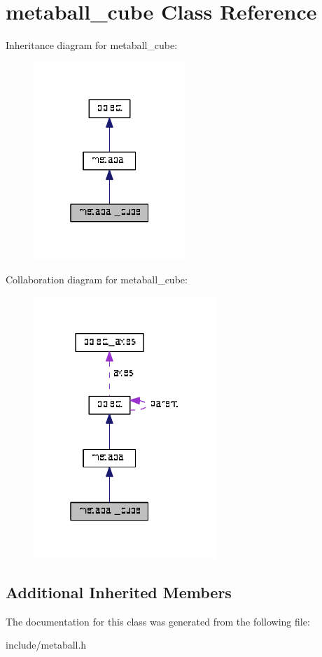 \hypertarget{classmetaball__cube}{}\section{metaball\+\_\+cube Class Reference}
\label{classmetaball__cube}


Inheritance diagram for metaball\+\_\+cube\+:\nopagebreak
\begin{figure}[H]
\begin{center}
\leavevmode
\includegraphics[width=163pt]{classmetaball__cube__inherit__graph}
\end{center}
\end{figure}


Collaboration diagram for metaball\+\_\+cube\+:\nopagebreak
\begin{figure}[H]
\begin{center}
\leavevmode
\includegraphics[width=196pt]{classmetaball__cube__coll__graph}
\end{center}
\end{figure}
\subsection*{Additional Inherited Members}


The documentation for this class was generated from the following file\+:\begin{DoxyCompactItemize}
\item 
include/metaball.\+h\end{DoxyCompactItemize}
